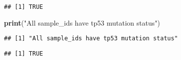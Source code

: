 \documentclass[]{article}
\newenvironment{Shaded}{\begin{snugshade}}{\end{snugshade}}
\newcommand{\KeywordTok}[1]{\textcolor[rgb]{0.13,0.29,0.53}{\textbf{#1}}}
\newcommand{\StringTok}[1]{\textcolor[rgb]{0.31,0.60,0.02}{#1}}
\newcommand{\OperatorTok}[1]{\textcolor[rgb]{0.81,0.36,0.00}{\textbf{#1}}}
\newcommand{\NormalTok}[1]{#1}
\begin{document}
\begin{Shaded}
\end{Shaded}

\begin{verbatim}
## [1] TRUE
\end{verbatim}

\begin{Shaded}
\begin{Highlighting}[]
\KeywordTok{print}\NormalTok{(}\StringTok{"All sample_ids have tp53 mutation status"}\NormalTok{)}
\end{Highlighting}
\end{Shaded}

\begin{verbatim}
## [1] "All sample_ids have tp53 mutation status"
\end{verbatim}

\begin{Shaded}
\end{Shaded}

\begin{verbatim}
## [1] TRUE
\end{verbatim}
\end{document}

